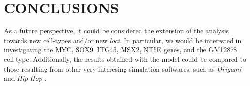 \section{CONCLUSIONS}


As a future perspective, it could be considered the extension of the analysis towards new cell-types and/or new \textit{loci}. In particular, we would be interested in investigating the MYC, SOX9, ITG45, MSX2, NT5E genes, and the GM12878 cell-type.
Additionally, the results obtained with the model could be compared to those resulting from other very interesing simulation softwares, such as \textit{Origami} and \textit{Hip-Hop}
\cite{bucklePolymerSimulationsHeteromorphic2018,tanCelltypespecificPrediction3D2023}.